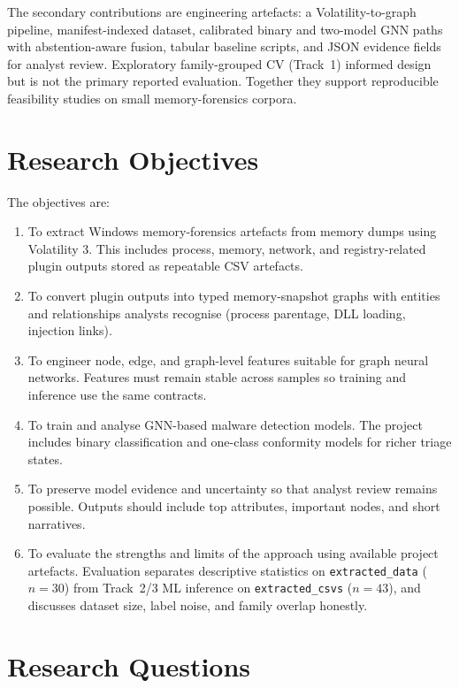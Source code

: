 The secondary contributions are engineering artefacts: a Volatility-to-graph pipeline, manifest-indexed dataset, calibrated binary and two-model GNN paths with abstention-aware fusion, tabular baseline scripts, and JSON evidence fields for analyst review. Exploratory family-grouped CV (Track~1) informed design but is not the primary reported evaluation. Together they support reproducible feasibility studies on small memory-forensics corpora.

\section{Research Objectives}

The objectives are:

\begin{enumerate}
\item To extract Windows memory-forensics artefacts from memory dumps using Volatility 3. This includes process, memory, network, and registry-related plugin outputs stored as repeatable CSV artefacts.
\item To convert plugin outputs into typed memory-snapshot graphs with entities and relationships analysts recognise (process parentage, DLL loading, injection links).
\item To engineer node, edge, and graph-level features suitable for graph neural networks. Features must remain stable across samples so training and inference use the same contracts.
\item To train and analyse GNN-based malware detection models. The project includes binary classification and one-class conformity models for richer triage states.
\item To preserve model evidence and uncertainty so that analyst review remains possible. Outputs should include top attributes, important nodes, and short narratives.
\item To evaluate the strengths and limits of the approach using available project artefacts. Evaluation separates descriptive statistics on \texttt{extracted\_data} ($n{=}30$) from Track~2/3 ML inference on \texttt{extracted\_csvs} ($n{=}43$), and discusses dataset size, label noise, and family overlap honestly.
\end{enumerate}

\section{Research Questions}

